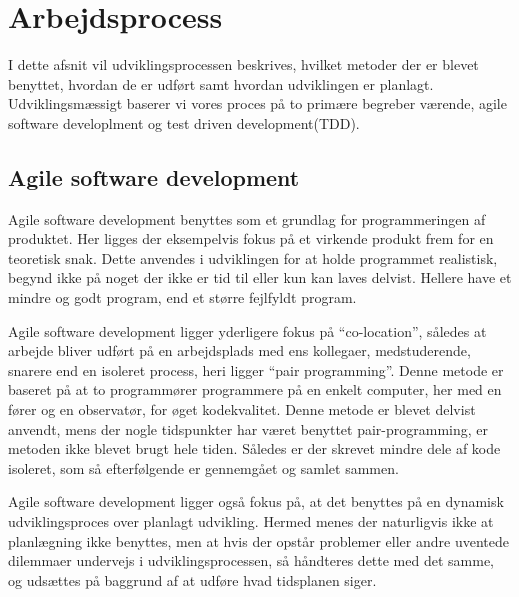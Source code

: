 \chapter{Arbejdsprocess}

I dette afsnit vil udviklingsprocessen beskrives, hvilket metoder der er blevet benyttet, hvordan de er udført samt hvordan udviklingen er planlagt. Udviklingsmæssigt baserer vi vores proces på to primære begreber værende, agile software developlment og test driven development(TDD).

\section{Agile software development}
Agile software development benyttes som et grundlag for programmeringen af produktet. 
Her ligges der eksempelvis fokus på et virkende produkt frem for en teoretisk snak. 
Dette anvendes i udviklingen for at holde programmet realistisk, begynd ikke på noget der ikke er tid til eller kun kan laves delvist. 
Hellere have et mindre og godt program, end et større fejlfyldt program.

Agile software development ligger yderligere fokus på ``co-location'', således at arbejde bliver udført på en arbejdsplads med ens kollegaer, medstuderende, snarere end en isoleret process, heri ligger ``pair programming''. Denne metode er baseret på at to programmører programmere på en enkelt computer, her med en fører og en observatør, for øget kodekvalitet. Denne metode er blevet delvist anvendt, mens der nogle tidspunkter har været benyttet pair-programming, er metoden ikke blevet brugt hele tiden. Således er der skrevet mindre dele af kode isoleret, som så efterfølgende er gennemgået og samlet sammen.

Agile software development ligger også fokus på, at det benyttes på en dynamisk udviklingsproces over planlagt udvikling. Hermed menes der naturligvis ikke at planlægning ikke benyttes, men at hvis der opstår problemer eller andre uventede dilemmaer undervejs i udviklingsprocessen, så håndteres dette med det samme, og udsættes på baggrund af at udføre hvad tidsplanen siger. 

